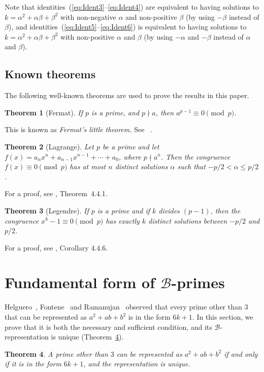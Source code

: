 \documentclass[reqno]{amsart}
\newtheorem{theorem}{Theorem}
\newcommand{\bprime} {\ensuremath{\mathcal B}-prime}
\newcommand{\brep}   {\ensuremath{\mathcal B}-representation}
\newcommand{\congr}[3]{{\ensuremath{{#1} \equiv {#2}
      \pmod{#3}}}}
\newcommand{\bq}[2]{\ensuremath{{#1}^2 + {#1}{#2} + {#2}^2}}
\newcommand{\bqab}{\bq{a}{b}}
\newcommand{\bqalbet}{\bq{\alpha}{\beta}}
\begin{document}
Note that identities~(\ref{eq:Ident3}--\ref{eq:Ident4})
are equivalent to having solutions to $k = \bqalbet$
with non-negative $\alpha$ and non-positive $\beta$ (by
using $-\beta$ instead of $\beta$), and
identities~(\ref{eq:Ident5}--\ref{eq:Ident6}) is
equivalent to having solutions to $k = \bqalbet$ with
non-positive $\alpha$ and $\beta$ (by using $-\alpha$
and $-\beta$ instead of $\alpha$ and $\beta$).


\subsection{Known theorems}
The following well-known theorems are used to prove the
results in this paper.

\begin{theorem}[Fermat]
  \label{th:FLT}
  If $p$ is a prime, and $p \nmid a$, then
  $\congr{a^{p-1}}{0}{p}$.
\end{theorem}
This is known as {\em Fermat's little theorem.} See
~\cite[\S{}6.1]{HAR1995}.
\begin{theorem}[Lagrange]
  \label{th:Lagrange}
Let $p$ be a prime and let $f(x) = a_nx^n + a_{n-1}x^{n-1} +
\cdots + a_0$, where $p \nmid a^n$.  Then the congruence
\congr{f(x)}{0}{p} has at most $n$ distinct solutions
$\alpha$ such that $-p/2 < \alpha \le p/2$.
\end{theorem}
For a proof, see \cite{ALL1995}, Theorem~4.4.1.
\begin{theorem}[Legendre]
  \label{th:KDistinctSolutions}
  If $p$ is a prime and if $k$ divides $(p-1)$, then the
  congruence \congr{x^k-1}{0}{p} 
  has exactly $k$ distinct
  solutions between $-p/2$ and $p/2$.
\end{theorem}
For a proof, see \cite{ALL1995}, Corollary 4.4.6.

\section{Fundamental form of \bprime{}s}
Helguero~\cite{DIC1923},  Fontene~\cite{DIC1923} and Ramanujan~\cite[pp.
259--260]{RAM1988} observed that every prime other than
$3$ that can be represented as \bqab{} is in the form
$6k+1$.  In this section, we prove that it is both the necessary
and sufficient condition, and its
\brep{} is unique (Theorem~\ref{th:BasicFull}).

\begin{theorem}
  \label{th:BasicFull}
  A prime other than $3$ can be represented as
  \bqab{} if and only if it is in the form $6k+1$, and the
  representation is unique.
\end{theorem}
\end{document}
